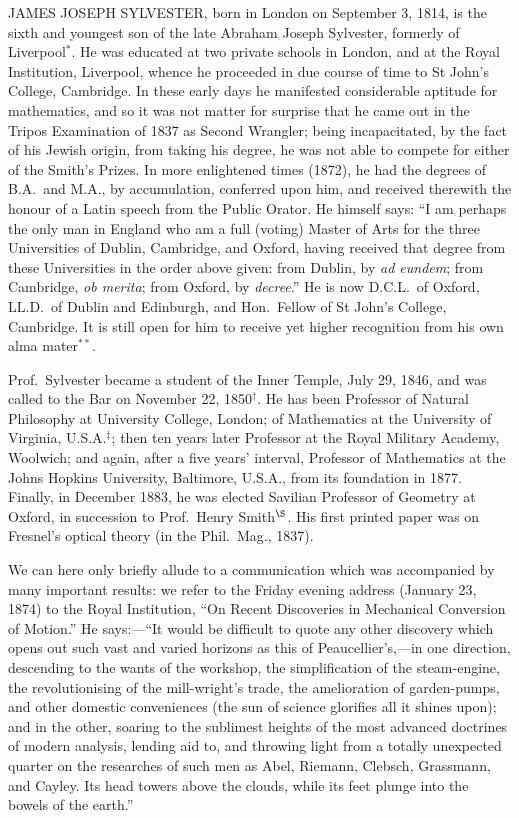 \documentclass[11pt,a4paper]{article}
\begin{document}
JAMES JOSEPH SYLVESTER, born in London on September 3, 1814, is the sixth and youngest son of the late Abraham Joseph Sylvester, formerly of Liverpool$^*$. He was educated at two private schools in London, and at the Royal Institution, Liverpool, whence he proceeded in due course of time to St John's College, Cambridge. In these early days he manifested considerable aptitude for mathematics, and so it was not matter for surprise that he came out in the Tripos Examination of 1837 as Second Wrangler; being incapacitated, by the fact of his Jewish origin, from taking his degree, he was not able to compete for either of the Smith's Prizes. In more enlightened times (1872), he had the degrees of B.A.\ and M.A., by accumulation, conferred upon him, and received therewith the honour of a Latin speech from the Public Orator. He himself says: ``I am perhaps the only man in England who am a full (voting) Master of Arts for the three Universities of Dublin, Cambridge, and Oxford, having received that degree from these Universities in the order above given: from Dublin, by \textit{ad eundem}; from Cambridge, \textit{ob merita}; from Oxford, by \textit{decree}.'' He is now D.C.L.\ of Oxford, LL.D.\ of Dublin and Edinburgh, and Hon.\ Fellow of St John's College, Cambridge. It is still open for him to receive yet higher recognition from his own alma mater$^{**}$.

Prof.\ Sylvester became a student of the Inner Temple, July 29, 1846, and was called to the Bar on November 22, 1850$^\dagger$. He has been Professor of Natural Philosophy at University College, London; of Mathematics at the University of Virginia, U.S.A.$^\ddagger$; then ten years later Professor at the Royal Military Academy, Woolwich; and again, after a five years' interval, Professor of Mathematics at the Johns Hopkins University, Baltimore, U.S.A., from its foundation in 1877. Finally, in December 1883, he was elected Savilian Professor of Geometry at Oxford, in succession to Prof.\ Henry Smith$^\S$. His first printed paper was on Fresnel's optical theory (in the Phil.\ Mag., 1837).

We can here only briefly allude to a communication which was accompanied by many important results: we refer to the Friday evening address (January 23, 1874) to the Royal Institution, ``On Recent Discoveries in Mechanical Conversion of Motion.'' He says:---``It would be difficult to quote any other discovery which opens out such vast and varied horizons as this of Peaucellier's,---in one direction, descending to the wants of the workshop, the simplification of the steam-engine, the revolutionising of the mill-wright's trade, the amelioration of garden-pumps, and other domestic conveniences (the sun of science glorifies all it shines upon); and in the other, soaring to the sublimest heights of the most advanced doctrines of modern analysis, lending aid to, and throwing light from a totally unexpected quarter on the researches of such men as Abel, Riemann, Clebsch, Grassmann, and Cayley. Its head towers above the clouds, while its feet plunge into the bowels of the earth.''
\end{document}
